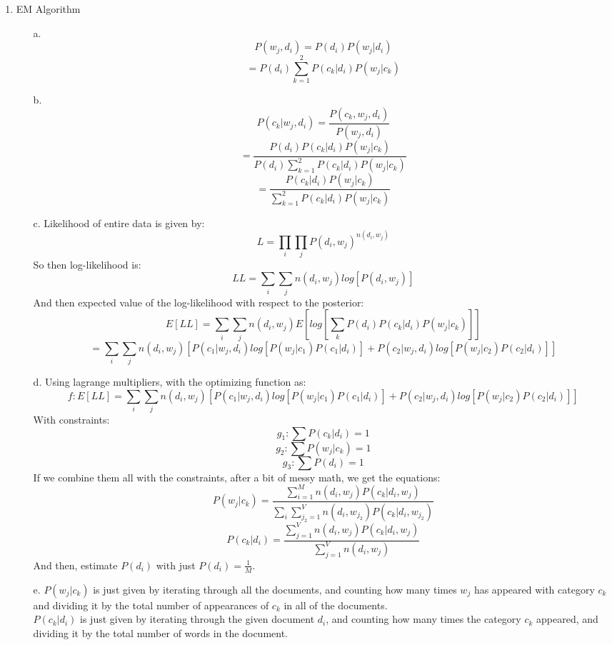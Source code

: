 

\oddsidemargin 0in
\evensidemargin 0in
\textwidth 6.5in
\topmargin -0.5in
\textheight 9.0in




\pagestyle{myheadings}  %

\begin{enumerate}
\item EM Algorithm
  \begin{enumerate}
  \item[a.]
    $$P(w_j,d_i) = P(d_i)P(w_j|d_i)$$
    $$=P(d_i)\sum_{k=1}^2 P(c_k|d_i)P(w_j|c_k)$$
  \item[b.]
    $$P(c_k|w_j,d_i) = \frac{P(c_k,w_j,d_i)}{P(w_j,d_i)}$$
    $$=\frac{P(d_i)P(c_k|d_i)P(w_j|c_k)}{P(d_i)\sum_{k=1}^2 P(c_k|d_i)P(w_j|c_k)}$$
    $$=\frac{P(c_k|d_i)P(w_j|c_k)}{\sum_{k=1}^2 P(c_k|d_i)P(w_j|c_k)}$$
  \item[c.]
    Likelihood of entire data is given by:
    $$L = \prod_i \prod_j P(d_i,w_j)^{n(d_i,w_j)}$$
    So then log-likelihood is:
    $$LL = \sum_i \sum_j n(d_i,w_j) log[P(d_i,w_j)]$$
    And then expected value of the log-likelihood with respect to the posterior:
    $$E[LL] = \sum_i \sum_j n(d_i,w_j) E[log[\sum_k P(d_i)P(c_k|d_i)P(w_j|c_k)]]$$
    $$= \sum_i \sum_j n(d_i,w_j)[P(c_1|w_j,d_i)log[P(w_j|c_1)P(c_1|d_i)]+P(c_2|w_j,d_i)log[P(w_j|c_2)P(c_2|d_i)]]$$
  \item[d.]
    Using lagrange multipliers, with the optimizing function as:
    $$f : E[LL] = \sum_i \sum_j n(d_i,w_j)[P(c_1|w_j,d_i)log[P(w_j|c_1)P(c_1|d_i)]+P(c_2|w_j,d_i)log[P(w_j|c_2)P(c_2|d_i)]]$$
    With constraints:
    $$g_1 : \sum P(c_k|d_i)=1$$
    $$g_2 : \sum P(w_j|c_k)=1$$
    $$g_3 : \sum P(d_i)=1$$
    If we combine them all with the constraints, after a bit of messy math, we get the equations:
    $$P(w_j|c_k) = \frac{\sum_{i=1}^M n(d_i,w_j)P(c_k|d_i,w_j)}{\sum_i \sum_{j_2=1}^V n(d_i,w_{j_2})P(c_k|d_i,w_{j_2})}$$
    $$P(c_k|d_i) = \frac{\sum_{j=1}^V n(d_i,w_j)P(c_k|d_i,w_j)}{\sum_{j=1}^V n(d_i,w_j)}$$
    And then, estimate $P(d_i)$ with just $P(d_i) = \frac{1}{M}$.
  \item[e.]
    $P(w_j|c_k)$ is just given by iterating through all the documents, and counting how many times $w_j$ has appeared with category $c_k$ and dividing it by the total number of appearances of $c_k$ in all of the documents.\\
    $P(c_k|d_i)$ is just given by iterating through the given document $d_i$, and counting how many times the category $c_k$ appeared, and dividing it by the total number of words in the document.\\

\end{enumerate}
\end{enumerate}
